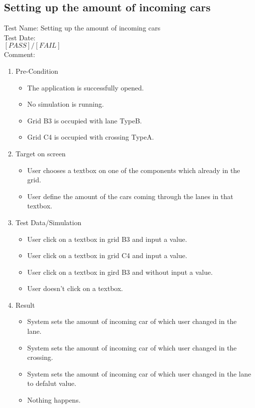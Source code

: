 \subsection{Setting up the amount of incoming cars }
Test Name: Setting up the amount of incoming cars\\Test Date: \\ $\left[ PASS \right] / \left[ FAIL \right]$\\Comment: \\
\begin{enumerate}
	\item Pre-Condition
	\begin{itemize}
		\item The application is successfully opened.
		\item No simulation is running.
		\item Grid B3 is occupied with lane TypeB.
		\item Grid C4 is occupied with crossing TypeA.
	\end{itemize}
	\item Target on screen
	\begin{itemize}
		\item User chooses a textbox on one of the components which already in the grid.
		\item User define the amount of the cars coming through the lanes in that textbox.
	\end{itemize}
	\item Test Data/Simulation
	\begin{itemize}
		\item User click on a textbox in grid B3 and input a value.
		\item User click on a textbox in grid C4 and input a value.
		\item User click on a textbox in gird B3 and without input a value.
		\item User doesn't click on a textbox.
	\end{itemize}
	\item Result
	\begin{itemize}
		\item System sets the amount of incoming car of which user changed in the lane.
		\item System sets the amount of incoming car of which user changed in the crossing.
		\item System sets the amount of incoming car of which user changed in the lane to defalut value.
		\item Nothing happens. 
	\end{itemize}
\end{enumerate}

